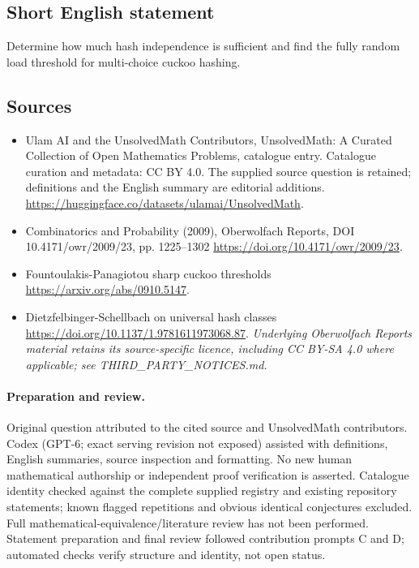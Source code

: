 \documentclass[11pt]{article}
\begin{document}
\subsection{Short English statement}
Determine how much hash independence is sufficient and find the fully random load threshold for multi-choice cuckoo hashing.
\subsection{Sources}
\begin{itemize}
\item[\hypertarget{source:statement:1}{S1}] Ulam AI and the UnsolvedMath Contributors, UnsolvedMath: A Curated Collection of Open Mathematics Problems, catalogue entry. Catalogue curation and metadata: CC BY 4.0. The supplied source question is retained; definitions and the English summary are editorial additions.
\url{https://huggingface.co/datasets/ulamai/UnsolvedMath}.
\item[\hypertarget{source:statement:2}{S2}] Combinatorics and Probability (2009), Oberwolfach Reports, DOI 10.4171/owr/2009/23, pp. 1225--1302
\url{https://doi.org/10.4171/owr/2009/23}.
\item[\hypertarget{source:statement:3}{S3}] Fountoulakis-Panagiotou sharp cuckoo thresholds
\url{https://arxiv.org/abs/0910.5147}.
\item[\hypertarget{source:statement:4}{S4}] Dietzfelbinger-Schellbach on universal hash classes
\url{https://doi.org/10.1137/1.9781611973068.87}.
\textit{Underlying Oberwolfach Reports material retains its source-specific licence, including CC BY-SA 4.0 where applicable; see THIRD\_PARTY\_NOTICES.md.}
\end{itemize}
\paragraph{Preparation and review.}
Original question attributed to the cited source and UnsolvedMath contributors. Codex (GPT-6; exact serving revision not exposed) assisted with definitions, English summaries, source inspection and formatting. No new human mathematical authorship or independent proof verification is asserted. Catalogue identity checked against the complete supplied registry and existing repository statements; known flagged repetitions and obvious identical conjectures excluded. Full mathematical-equivalence/literature review has not been performed. Statement preparation and final review followed contribution prompts C and D; automated checks verify structure and identity, not open status.
\label{end:statement}
\end{document}
